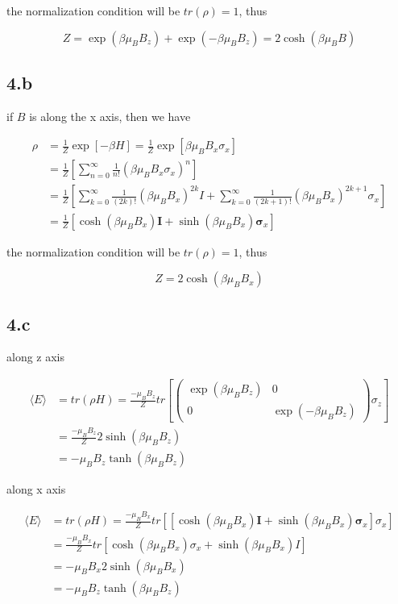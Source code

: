 \documentclass{article}
\begin{document}
the normalization condition will be $tr(\rho) = 1$, thus

$$
Z = \exp(\beta\mu_B B_z) + \exp(-\beta\mu_B B_z) = 2\cosh(\beta \mu_B B)
$$

\subsection*{4.b}
if $B$ is along the x axis, then we have

$$
\begin{aligned}
    \rho &= \frac{1}{Z} \exp[-\beta H] = \frac{1}{Z} \exp[\beta\mu_B B_x \sigma_x]\\
    &=\frac{1}{Z}[\sum_{n=0}^{\infty} \frac{1}{n!} (\beta\mu_B B_x \sigma_x)^n]\\
    &=\frac{1}{Z}[\sum_{k=0}^{\infty} \frac{1}{(2k)!} (\beta\mu_B B_x)^{2k} I + \sum_{k=0}^{\infty} \frac{1}{(2k+1)!} (\beta\mu_B B_x)^{2k+1} \sigma_x]\\
    &=\frac{1}{Z}[\cosh(\beta\mu_B B_x) \mathbf{I} + \sinh(\beta\mu_B B_x)\mathbf{\sigma}_x]
\end{aligned}
$$

the normalization condition will be $tr(\rho) = 1$, thus

$$
Z = 2\cosh(\beta\mu_B B_x)
$$

\subsection*{4.c}
along z axis

$$
\begin{aligned}
    \langle E \rangle &= tr(\rho H) = \frac{-\mu_B B_z}{Z}tr[\begin{pmatrix}
        \exp(\beta\mu_B B_z) & 0\\
        0 & \exp(-\beta\mu_B B_z)
    \end{pmatrix} \sigma_z]\\
    &= \frac{-\mu_B B_z}{Z} 2\sinh(\beta\mu_B B_z)\\
    &= -\mu_B B_z \tanh(\beta\mu_B B_z)
\end{aligned}
$$

along x axis

$$
\begin{aligned}
    \langle E \rangle &= tr(\rho H) = \frac{-\mu_B B_x}{Z} tr[[\cosh(\beta\mu_B B_x) \mathbf{I} + \sinh(\beta\mu_B B_x)\mathbf{\sigma}_x]\sigma_x]\\
    &=\frac{-\mu_B B_x}{Z} tr[\cosh(\beta\mu_B B_x) \sigma_x + \sinh(\beta\mu_B B_x) I]\\
    &=-\mu_B B_x 2\sinh(\beta\mu_B B_x)\\
    &=-\mu_B B_z \tanh(\beta\mu_B B_z)
\end{aligned}
$$
\end{document}
